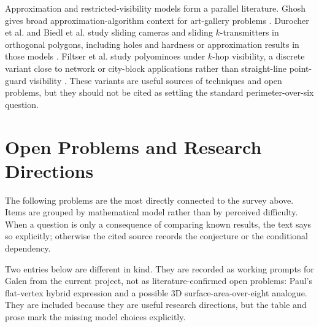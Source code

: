 \documentclass[11pt]{article}
\begin{document}
Approximation and restricted-visibility models form a parallel literature.
Ghosh gives broad approximation-algorithm context for art-gallery problems
\cite{Ghosh2010}.  Durocher et al. and Biedl et al. study sliding cameras and
sliding $k$-transmitters in orthogonal polygons, including holes and hardness
or approximation results in those models
\cite{DurocherEtAl2017,BiedlEtAl2019}.  Filtser et al. study polyominoes under
$k$-hop visibility, a discrete variant close to network or city-block
applications rather than straight-line point-guard visibility
\cite{FiltserEtAl2025}.  These variants are useful sources of techniques and
open problems, but they should not be cited as settling the standard
perimeter-over-six question.

\section{Open Problems and Research Directions}

The following problems are the most directly connected to the survey above.
Items are grouped by mathematical model rather than by perceived difficulty.
When a question is only a consequence of comparing known results, the text
says so explicitly; otherwise the cited source records the conjecture or the
conditional dependency.

Two entries below are different in kind.  They are recorded as working prompts
for Galen from the current project, not as literature-confirmed open problems:
Paul's flat-vertex hybrid expression and a possible 3D surface-area-over-eight
analogue.  They are included because they are useful research directions, but
the table and prose mark the missing model choices explicitly.
\end{document}
